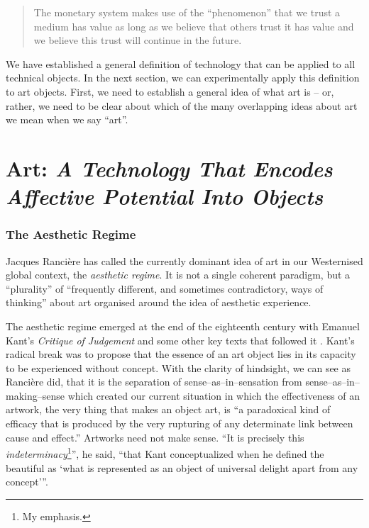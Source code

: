 \documentclass[letterpaper]{article}
\begin{document}
    \begin{quote}
        The monetary system makes use of the “phenomenon” that we trust a medium has value as long as we believe that others trust it has value and we believe this trust will continue in the future. \citep[p.55]{theNatureOfTechnology2009}
    \end{quote}

    We have established a general definition of technology that can be applied to all technical objects. In the next section, we can experimentally apply this definition to art objects. First, we need to establish a general idea of what art is – or, rather, we need to be clear about which of the many overlapping ideas about art we mean when we say “art”.

\section{Art: \emph{A Technology That Encodes Affective Potential Into Objects}}

    \subsubsection{The Aesthetic Regime}

    Jacques Rancière has called the currently dominant idea of art in our Westernised global context, the \emph{aesthetic regime}. It is not a single coherent paradigm, but a “plurality” of “frequently different, and sometimes contradictory, ways of thinking” \citep[p.8]{RanciereMdrnTms2022} about art organised around the idea of aesthetic experience.
    
    The aesthetic regime emerged at the end of the eighteenth century with Emanuel Kant's \emph{Critique of Judgement} and some other key texts that followed it \citep[pp.23–24]{RancierPltcsOfThAsthtcs2004}. Kant's radical break was to propose that the essence of an art object lies in its capacity to be experienced without concept. With the clarity of hindsight, we can see as Rancière did, that it is the separation of sense–as–in–sensation from sense–as–in–making–sense which created our current situation in which the effectiveness of an artwork, the very thing that makes an object art, is “a paradoxical kind of efficacy that is produced by the very rupturing of any determinate link between cause and effect.” Artworks need not make sense. “It is precisely this \emph{indeterminacy}\footnote{
        My emphasis.
    }”, he said, “that Kant conceptualized when he defined the beautiful as ‘what is represented as an object of universal delight apart from any concept’”. \citep[p.51-52]{RancierThEmncptdSpcttr2009}
\end{document}
